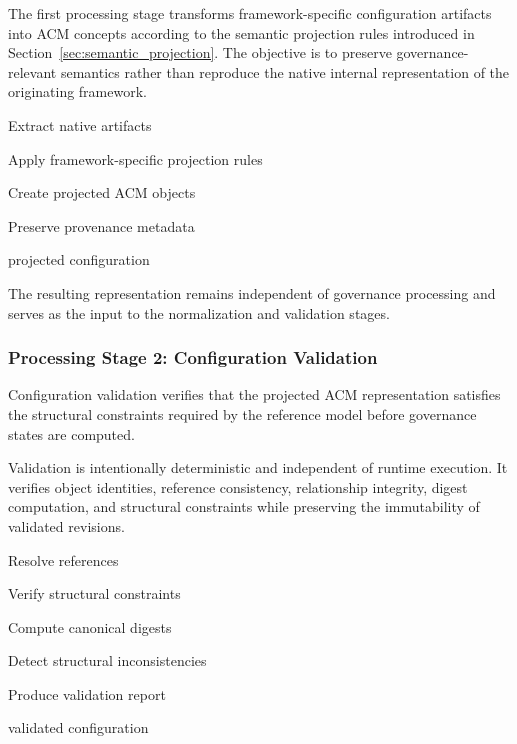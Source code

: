 \documentclass[10pt]{article}
\begin{document}
The first processing stage transforms framework-specific configuration artifacts into ACM concepts according to the semantic projection rules introduced in Section~\ref{sec:semantic_projection}. The objective is to preserve governance-relevant semantics rather than reproduce the native internal representation of the originating framework.

\begin{algorithm}[ht]
\caption{Semantic Projection}

Extract native artifacts\;

Apply framework-specific projection rules\;

Create projected ACM objects\;

Preserve provenance metadata\;

\Return projected configuration\;

\end{algorithm}

The resulting representation remains independent of governance processing and serves as the input to the normalization and validation stages.

\subsubsection{Processing Stage 2: Configuration Validation}

Configuration validation verifies that the projected ACM representation satisfies the structural constraints required by the reference model before governance states are computed.

Validation is intentionally deterministic and independent of runtime execution. It verifies object identities, reference consistency, relationship integrity, digest computation, and structural constraints while preserving the immutability of validated revisions.

\begin{algorithm}[ht]
\caption{Configuration Validation}

Resolve references\;

Verify structural constraints\;

Compute canonical digests\;

Detect structural inconsistencies\;

Produce validation report\;

\Return validated configuration\;

\end{algorithm}
\end{document}
